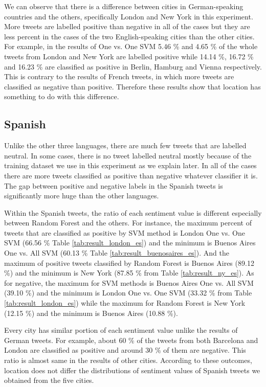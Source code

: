 We can observe that there is a difference between cities in German-speaking countries and the others, specifically London and New York in this experiment.
More tweets are labelled positive than negative in all of the cases but they are less percent in the cases of the two English-speaking cities than the other cities.
For example, in the results of One vs. One SVM 5.46 \% and 4.65 \% of the whole tweets from London and New York are labelled positive while 14.14 \%, 16.72 \% and 16.23 \% are classified as positive in Berlin, Hamburg and Vienna respectively. 
This is contrary to the results of French tweets, in which more tweets are classified as negative than positive.
Therefore these results show that location has something to do with this difference.
\subsection{Spanish}
Unlike the other three languages, there are much few tweets that are labelled neutral.
In some cases, there is no tweet labelled neutral mostly because of the training dataset we use in this experiment as we explain later.
In all of the cases there are more tweets classified as positive than negative whatever classifier it is.
The gap between positive and negative labels in the Spanish tweets is significantly more huge than the other languages. 

Within the Spanish tweets, the ratio of each sentiment value is different especially between Random Forest and the others.
For instance, the maximum percent of tweets that are classified as positive by SVM method is London One vs. One SVM (66.56 \% Table \ref{tab:result_london_es}) and the minimum is Buenos Aires One vs. All SVM (60.13 \% Table \ref{tab:result_buenosaires_es}).
And the maximum of positive tweets classified by Random Forest is Buenos Aires (89.12 \%) and the minimum is New York (87.85 \% from Table \ref{tab:result_ny_es}). 
As for negative, the maximum for SVM methods is Buenos Aires One vs. All SVM (39.10 \%) and the minimum is London One vs. One SVM (33.32 \% from Table \ref{tab:result_london_es}) while the maximum for Random Forest is New York (12.15 \%) and the minimum is Buenos Aires (10.88 \%).

Every city has similar portion of each sentiment value unlike the results of German tweets.
For example, about 60 \% of the tweets from both Barcelona and London are classified as positive and around 30 \% of them are negative.
This ratio is almost same in the results of other cities.
According to these outcomes, location does not differ the distributions of sentiment values of Spanish tweets we obtained from the five cities.


